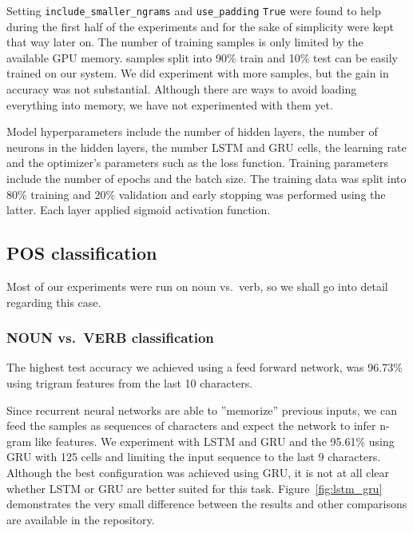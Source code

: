 \documentclass{article}
\begin{document}
Setting \texttt{include\_smaller\_ngrams} and \texttt{use\_padding} \texttt{True} were found to help during the first half of the experiments and for the sake of simplicity were kept that way later on.
The number of training samples is only limited by the available GPU memory.
 samples split into 90\% train and 10\% test can be easily trained on our system.
We did experiment with more samples, but the gain in accuracy was not substantial.
Although there are ways to avoid loading everything into memory, we have not experimented with them yet.

Model hyperparameters include the number of hidden layers, the number of neurons in the hidden layers, the number LSTM and GRU cells, the learning rate and the optimizer's parameters such as the loss function.
Training parameters include the number of epochs and the batch size.
The training data was split into 80\% training and 20\% validation and early stopping was performed using the latter.
Each layer applied sigmoid activation function.

\subsection{POS classification}

Most of our experiments were run on noun vs.~verb, so we shall go into detail regarding this case.

\subsubsection{NOUN vs.~VERB classification}

The highest test accuracy we achieved using a feed forward network, was 96.73\% using trigram features from the last 10 characters.

Since recurrent neural networks are able to ''memorize'' previous inputs, we can feed the samples as sequences of characters and expect the network to infer n-gram like features.
We experiment with LSTM and GRU and the 95.61\% using GRU with 125 cells and limiting the input sequence to the last 9 characters.
Although the best configuration was achieved using GRU, it is not at all clear whether LSTM or GRU are better suited for this task.
Figure~\ref{fig:lstm_gru} demonstrates the very small difference between the results and other comparisons are available in the repository.
\end{document}
